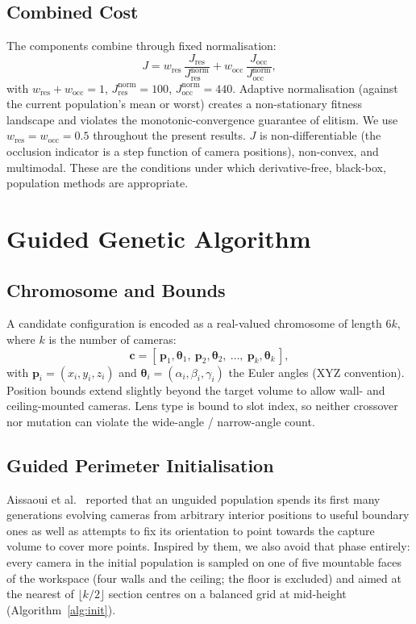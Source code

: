 \documentclass[conference]{IEEEtran}
\begin{document}
\subsection{Combined Cost} \label{CO}
The components combine through fixed normalisation:
\begin{equation}
\label{eq:combined-cost}
J = w_\text{res}\,\frac{J_\text{res}}{J_\text{res}^\text{norm}}
  + w_\text{occ}\,\frac{J_\text{occ}}{J_\text{occ}^\text{norm}},
\end{equation}
with $w_\text{res}+w_\text{occ}=1$, $J_\text{res}^\text{norm}=100$, $J_\text{occ}^\text{norm}=440$. Adaptive normalisation (against the current population's mean or worst) creates a non-stationary fitness landscape and violates the monotonic-convergence guarantee of elitism. We use $w_\text{res}=w_\text{occ}=0.5$ throughout the present results. $J$ is non-differentiable (the occlusion indicator is a step function of camera positions), non-convex, and multimodal. These are the conditions under which derivative-free, black-box, population methods are appropriate.

\section{Guided Genetic Algorithm}
\label{sec:ga}
\subsection{Chromosome and Bounds}
A candidate configuration is encoded as a real-valued chromosome of length $6k$, where $k$ is the number of cameras:
\begin{equation}
\label{eq:chromosome}
\mathbf{c} = [\,\mathbf{p}_1,\boldsymbol{\theta}_1,\ \mathbf{p}_2,\boldsymbol{\theta}_2,\ \ldots,\ \mathbf{p}_k,\boldsymbol{\theta}_k\,],
\end{equation}
with $\mathbf{p}_i=(x_i,y_i,z_i)$ and $\boldsymbol{\theta}_i=(\alpha_i,\beta_i,\gamma_i)$ the Euler angles (XYZ convention). Position bounds extend slightly beyond the target volume to allow wall- and ceiling-mounted cameras. Lens type is bound to slot index, so neither crossover nor mutation can violate the wide-angle / narrow-angle count.

\subsection{Guided Perimeter Initialisation}
Aissaoui et al.~\cite{aissaoui_designing_2018} reported that an unguided population spends its first many generations evolving cameras from arbitrary interior positions to useful boundary ones as well as attempts to fix its orientation to point towards the capture volume to cover more points. Inspired by them, we also avoid that phase entirely: every camera in the initial population is sampled on one of five mountable faces of the workspace (four walls and the ceiling; the floor is excluded) and aimed at the nearest of $\lfloor k/2 \rfloor$ section centres on a balanced grid at mid-height
(Algorithm~\ref{alg:init}).
\end{document}
